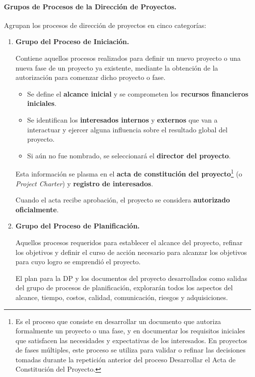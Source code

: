 \documentclass[10pt,a4paper]{article}
\begin{document}
\paragraph{Grupos de Procesos de la Dirección de Proyectos.}
Agrupan los procesos de dirección de proyectos en cinco categorías:
\begin{enumerate}
\item \textbf{Grupo del Proceso de Iniciación.}

Contiene aquellos procesos realizados para definir un nuevo proyecto o una
nueva fase de un proyecto ya existente, mediante la obtención de la
autorización para comenzar dicho proyecto o fase.

\begin{itemize}
\item Se define el \textbf{alcance inicial} y se comprometen los \textbf{recursos financieros iniciales}.
\item Se identifican los \textbf{interesados internos} y \textbf{externos} que van a interactuar y ejercer alguna influencia sobre el resultado global del proyecto.
\item Si aún no fue nombrado, se seleccionará el \textbf{director del proyecto}.
\end{itemize}

Esta información se plasma en el \textbf{acta de constitución del proyecto}\footnote{Es el proceso que consiste en desarrollar un documento que autoriza formalmente un proyecto o una fase, y en documentar los requisitos iniciales que satisfacen las necesidades y expectativas de los interesados. En proyectos de fases múltiples, este proceso se utiliza para validar o refinar las decisiones tomadas durante la repetición anterior del proceso Desarrollar el Acta de Constitución del Proyecto.} (o \textit{Project Charter})
 y \textbf{registro de interesados}.

Cuando el acta recibe aprobación, el proyecto se considera \textbf{autorizado oficialmente}.

\item \textbf{Grupo del Proceso de Planificación.}

Aquellos procesos requeridos para establecer el alcance del proyecto, refinar los objetivos y definir el curso de acción necesario para alcanzar los objetivos para cuyo logro se emprendió el proyecto.

El plan para la DP y los documentos del proyecto desarrollados como salidas del grupo de procesos de planificación, explorarán todos los aspectos del alcance, tiempo, costos, calidad, comunicación, riesgos y adquisiciones.


\end{enumerate}
\end{document}
